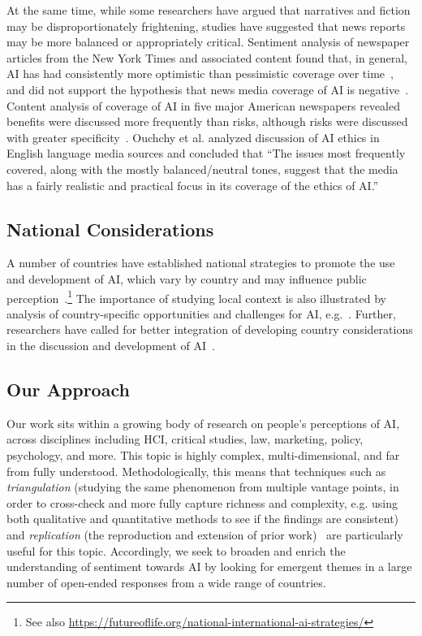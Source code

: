 \documentclass[11pt]{article} %
\begin{document}
At the same time, while some researchers have argued that narratives and fiction may be disproportionately frightening, studies have suggested that news reports may be more balanced or appropriately critical. Sentiment analysis of newspaper articles from the New York Times and associated content found that, in general, AI has had consistently more optimistic than pessimistic coverage over time~\cite{fast2017long}, and did not support the hypothesis that news media coverage of AI is negative~\cite{garvey2019sentiment}. Content analysis of coverage of AI in five major American newspapers revealed benefits were discussed more frequently than risks, although risks were discussed with greater specificity~\cite{chuan2019}. Ouchchy et al. analyzed discussion of AI ethics in English language media sources and concluded that ``The issues most frequently covered, along with the mostly balanced/neutral tones, suggest that the media has a fairly realistic and practical focus in its coverage of the ethics of AI.''~\cite{ouchchy2020}

\subsection{National Considerations}
A number of countries have established national strategies to promote the use and development of AI, which vary by country and may influence public perception~\cite{dutton2018}.\footnote{See also \url{https://futureoflife.org/national-international-ai-strategies/}} 
The importance of studying local context is also illustrated by analysis of country-specific opportunities and challenges for AI, e.g.~\cite{kalyanakrishnan2018opportunities}.
Further, researchers have called for better integration of developing country considerations in the discussion and development of AI~\cite{sambasivan2019toward}.

\subsection{Our Approach}
Our work sits within a growing body of research on people’s perceptions of AI, across disciplines including HCI, critical studies, law, marketing, policy, psychology, and more. This topic is highly complex, multi-dimensional, and far from fully understood. Methodologically, this means that techniques such as \textit{triangulation} (studying the same phenomenon from multiple vantage points, in order to cross-check and more fully capture richness and complexity, e.g. using both qualitative and quantitative methods to see if the findings are consistent)~\cite{salkind2010} and \textit{replication} (the reproduction and extension of prior work)~\cite{wilson2014} are particularly useful for this topic. Accordingly, we seek to broaden and enrich the understanding of sentiment towards AI by looking for emergent themes in a large number of open-ended responses from a wide range of countries.
\end{document}
